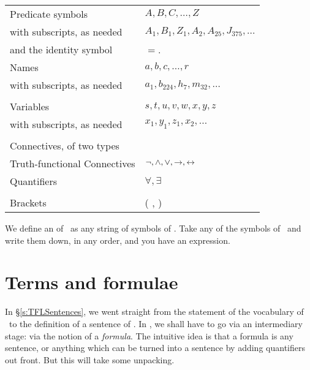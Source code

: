 \begin{center}
\begin{tabular}{l l} \toprule 
Predicate symbols & $A,B,C,…,Z$\\
with subscripts, as needed & $A_{1}, B_{1},Z_{1},A_{2},A_{25},J_{375},…$\\
and the identity symbol &  $=$.
\\
Names & $a,b,c,…, r$\\
with subscripts, as needed & $a_{1}, b_{224}, h_7, m_{32},…$\\
\\
Variables & $s, t, u, v, w, x,y,z$\\
with subscripts, as needed & $x_{1}, y_{1}, z_{1}, x_{2},…$\\
\\
Connectives, of two types & \\
Truth-functional Connectives & $\neg,\wedge,\vee,\rightarrow,\leftrightarrow$\\
Quantifiers & $\forall, \exists$\\
\\
Brackets &( , )\\
\bottomrule \end{tabular}
\end{center}
We define an  of \FOL\ as any string of symbols of \FOL. Take any of the symbols of \FOL\ and write them down, in any order, and you have an expression.

\section{Terms and formulae}
In §\ref{s:TFLSentences}, we went straight from the statement of the vocabulary of \TFL\ to the definition of a sentence of \TFL. In \FOL, we shall have to go via an intermediary stage: via the notion of a  \emph{formula}. The intuitive idea is that a formula is any sentence, or anything which can be turned into a sentence by adding quantifiers out front. But this will take some unpacking.

